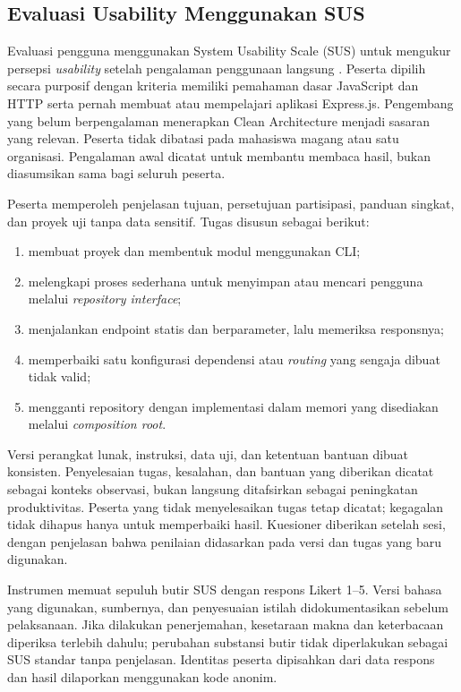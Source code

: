 \documentclass[12pt,a4paper,oneside]{report}
\begin{document}
\subsection{Evaluasi Usability Menggunakan SUS}
Evaluasi pengguna menggunakan System Usability Scale (SUS) untuk mengukur persepsi \textit{usability} setelah pengalaman penggunaan langsung \cite{brooke1996sus}. Peserta dipilih secara purposif dengan kriteria memiliki pemahaman dasar JavaScript dan HTTP serta pernah membuat atau mempelajari aplikasi Express.js. Pengembang yang belum berpengalaman menerapkan Clean Architecture menjadi sasaran yang relevan. Peserta tidak dibatasi pada mahasiswa magang atau satu organisasi. Pengalaman awal dicatat untuk membantu membaca hasil, bukan diasumsikan sama bagi seluruh peserta.

Peserta memperoleh penjelasan tujuan, persetujuan partisipasi, panduan singkat, dan proyek uji tanpa data sensitif. Tugas disusun sebagai berikut:
\begin{enumerate}
\item membuat proyek dan membentuk modul menggunakan CLI;
\item melengkapi proses sederhana untuk menyimpan atau mencari pengguna melalui \textit{repository interface};
\item menjalankan endpoint statis dan berparameter, lalu memeriksa responsnya;
\item memperbaiki satu konfigurasi dependensi atau \textit{routing} yang sengaja dibuat tidak valid;
\item mengganti repository dengan implementasi dalam memori yang disediakan melalui \textit{composition root}.
\end{enumerate}
Versi perangkat lunak, instruksi, data uji, dan ketentuan bantuan dibuat konsisten. Penyelesaian tugas, kesalahan, dan bantuan yang diberikan dicatat sebagai konteks observasi, bukan langsung ditafsirkan sebagai peningkatan produktivitas. Peserta yang tidak menyelesaikan tugas tetap dicatat; kegagalan tidak dihapus hanya untuk memperbaiki hasil. Kuesioner diberikan setelah sesi, dengan penjelasan bahwa penilaian didasarkan pada versi dan tugas yang baru digunakan.

Instrumen memuat sepuluh butir SUS dengan respons Likert 1--5. Versi bahasa yang digunakan, sumbernya, dan penyesuaian istilah didokumentasikan sebelum pelaksanaan. Jika dilakukan penerjemahan, kesetaraan makna dan keterbacaan diperiksa terlebih dahulu; perubahan substansi butir tidak diperlakukan sebagai SUS standar tanpa penjelasan. Identitas peserta dipisahkan dari data respons dan hasil dilaporkan menggunakan kode anonim.
\end{document}
